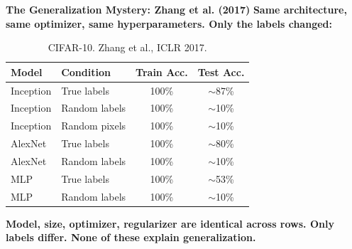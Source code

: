 \documentclass[aspectratio=169]{beamer}
\begin{document}
\begin{frame}{\textcolor{cmindsblue}{\textbf{The Generalization Mystery: Zhang et al. (2017)}}}
    \vspace{-0.3cm}
    \textbf{Same architecture, same optimizer, same hyperparameters. Only the labels changed:}
    \vspace{0.2cm}
    
    \begin{table}
    \centering
    \small
    \begin{tabular}{llcc}
    \toprule
    \textbf{Model} & \textbf{Condition} & \textbf{Train Acc.} & \textbf{Test Acc.} \\
    \midrule
    Inception & True labels        & 100\% & $\sim$87\% \\
    \rowcolor{orange!15}
    Inception & Random labels      & 100\% & $\sim$10\% \\
    \rowcolor{orange!15}
    Inception & Random pixels      & 100\% & $\sim$10\% \\
    \midrule
    AlexNet   & True labels        & 100\% & $\sim$80\% \\
    \rowcolor{orange!15}
    AlexNet   & Random labels      & 100\% & $\sim$10\% \\
    \midrule
    MLP       & True labels        & 100\% & $\sim$53\% \\
    \rowcolor{orange!15}
    MLP       & Random labels      & 100\% & $\sim$10\% \\
    \bottomrule
    \end{tabular}
    \caption*{\footnotesize CIFAR-10. Zhang et al., ICLR 2017.}
    \end{table}
    
    \vspace{0.1cm}
    \textbf{Model, size, optimizer, regularizer are identical across rows. Only labels differ. None of these explain generalization.}
\end{frame}
\end{document}
